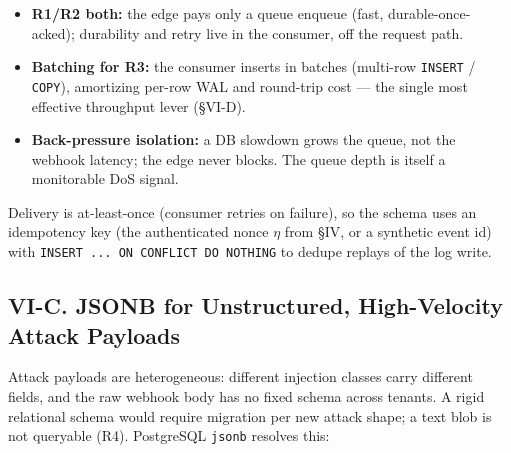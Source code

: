 \begin{itemize}
\tightlist
\item
  \textbf{R1/R2 both:} the edge pays only a queue enqueue (fast,
  durable-once-acked); durability and retry live in the consumer, off
  the request path.
\item
  \textbf{Batching for R3:} the consumer inserts in batches (multi-row
  \passthrough{\lstinline!INSERT!} / \passthrough{\lstinline!COPY!}),
  amortizing per-row WAL and round-trip cost --- the single most
  effective throughput lever (§VI-D).
\item
  \textbf{Back-pressure isolation:} a DB slowdown grows the queue, not
  the webhook latency; the edge never blocks. The queue depth is itself
  a monitorable DoS signal.
\end{itemize}

Delivery is at-least-once (consumer retries on failure), so the schema
uses an idempotency key (the authenticated nonce \(\eta\) from §IV, or a
synthetic event id) with
\passthrough{\lstinline!INSERT ... ON CONFLICT DO NOTHING!} to dedupe
replays of the log write.

\subsection{VI-C. JSONB for Unstructured, High-Velocity Attack
Payloads}\label{vi-c-jsonb-for-unstructured-high-velocity-attack-payloads}

Attack payloads are heterogeneous: different injection classes carry
different fields, and the raw webhook body has no fixed schema across
tenants. A rigid relational schema would require migration per new
attack shape; a text blob is not queryable (R4). PostgreSQL
\passthrough{\lstinline!jsonb!} resolves this:

